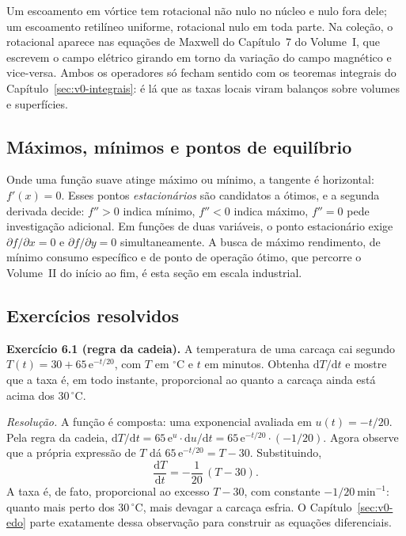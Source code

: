\documentclass[12pt,a4paper]{article}
\numberwithin{equation}{section}
\numberwithin{table}{section}
\numberwithin{figure}{section}
\begin{document}
Um escoamento em vórtice tem rotacional não nulo no núcleo e nulo fora
dele; um escoamento retilíneo uniforme, rotacional nulo em toda parte. Na
coleção, o rotacional aparece nas equações de Maxwell do Capítulo~7 do
Volume~I, que escrevem o campo elétrico girando em torno da variação do
campo magnético e vice-versa. Ambos os operadores só fecham sentido com os
teoremas integrais do Capítulo~\ref{sec:v0-integrais}: é lá que as taxas
locais viram balanços sobre volumes e superfícies.

\subsection{Máximos, mínimos e pontos de equilíbrio}

Onde uma função suave atinge máximo ou mínimo, a tangente é horizontal:
$f'(x) = 0$. Esses pontos \emph{estacionários} são candidatos a ótimos, e
a segunda derivada decide: $f'' > 0$ indica mínimo, $f'' < 0$ indica
máximo, $f'' = 0$ pede investigação adicional. Em funções de duas
variáveis, o ponto estacionário exige $\partial f/\partial x = 0$ e
$\partial f/\partial y = 0$ simultaneamente. A busca de máximo
rendimento, de mínimo consumo específico e de ponto de operação ótimo,
que percorre o Volume~II do início ao fim, é esta seção em escala
industrial.

\subsection{Exercícios resolvidos}

\textbf{Exercício 6.1 (regra da cadeia).} A temperatura de uma carcaça cai
segundo $T(t) = 30 + 65\,\mathrm{e}^{-t/20}$, com $T$ em
$^\circ\mathrm{C}$ e $t$ em minutos. Obtenha $\mathrm{d}T/\mathrm{d}t$ e
mostre que a taxa é, em todo instante, proporcional ao quanto a carcaça
ainda está acima dos $30\,^\circ\mathrm{C}$.

\emph{Resolução.} A função é composta: uma exponencial avaliada em
$u(t) = -t/20$. Pela regra da cadeia,
$\mathrm{d}T/\mathrm{d}t = 65\,\mathrm{e}^{u}\cdot\mathrm{d}u/\mathrm{d}t
= 65\,\mathrm{e}^{-t/20}\cdot(-1/20)$. Agora observe que a própria
expressão de $T$ dá $65\,\mathrm{e}^{-t/20} = T - 30$. Substituindo,
$$\frac{\mathrm{d}T}{\mathrm{d}t} = -\frac{1}{20}\,(T - 30).$$
A taxa é, de fato, proporcional ao excesso $T - 30$, com constante
$-1/20\ \mathrm{min}^{-1}$: quanto mais perto dos
$30\,^\circ\mathrm{C}$, mais devagar a carcaça esfria. O
Capítulo~\ref{sec:v0-edo} parte exatamente dessa observação para
construir as equações diferenciais.
\end{document}
